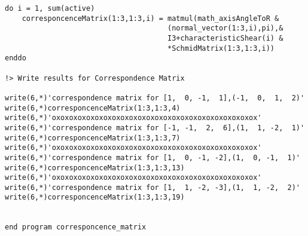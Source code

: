\begin{verbatim}
do i = 1, sum(active)
    corresponcenceMatrix(1:3,1:3,i) = matmul(math_axisAngleToR &
                                      (normal_vector(1:3,i),pi),&
                                      I3+characteristicShear(i) &
                                      *SchmidMatrix(1:3,1:3,i))
enddo

!> Write results for Correspondence Matrix
    
write(6,*)'correspondence matrix for [1,  0, -1,  1],(-1,  0,  1,  2)'
write(6,*)corresponcenceMatrix(1:3,1:3,4)
write(6,*)'oxoxoxoxoxoxoxoxoxoxoxoxoxoxoxoxoxoxoxoxoxoxoxox'
write(6,*)'correspondence matrix for [-1, -1,  2,  6],(1,  1, -2,  1)'
write(6,*)corresponcenceMatrix(1:3,1:3,7)
write(6,*)'oxoxoxoxoxoxoxoxoxoxoxoxoxoxoxoxoxoxoxoxoxoxoxox'
write(6,*)'correspondence matrix for [1,  0, -1, -2],(1,  0, -1,  1)'
write(6,*)corresponcenceMatrix(1:3,1:3,13)
write(6,*)'oxoxoxoxoxoxoxoxoxoxoxoxoxoxoxoxoxoxoxoxoxoxoxox'
write(6,*)'correspondence matrix for [1,  1, -2, -3],(1,  1, -2,  2)'
write(6,*)corresponcenceMatrix(1:3,1:3,19)


end program corresponcence_matrix


\end{verbatim}
